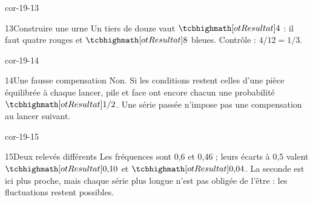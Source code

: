 \begin{blocLivre}{cor-19-13}\begin{corrige}{13}{Construire une urne}
Un tiers de douze vaut $\res4$ : il faut quatre rouges et $\res8$ bleues. Contrôle : $4/12=1/3$.
\label{fig-cor-19-13}
\end{corrige}\end{blocLivre}
\begin{blocLivre}{cor-19-14}\begin{corrige}{14}{Une fausse compensation}
Non. Si les conditions restent celles d’une pièce équilibrée à chaque lancer, pile et face ont encore chacun une probabilité $\res{1/2}$. Une série passée n’impose pas une compensation au lancer suivant.
\end{corrige}\end{blocLivre}
\begin{blocLivre}{cor-19-15}\begin{corrige}{15}{Deux relevés différents}
Les fréquences sont 0,6 et 0,46 ; leurs écarts à 0,5 valent $\res{0{,}10}$ et $\res{0{,}04}$. La seconde est ici plus proche, mais chaque série plus longue n’est pas obligée de l’être : les fluctuations restent possibles.
\end{corrige}\end{blocLivre}
